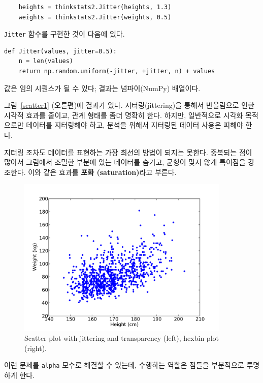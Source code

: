 
%
\begin{verbatim}
    heights = thinkstats2.Jitter(heights, 1.3)
    weights = thinkstats2.Jitter(weights, 0.5)
\end{verbatim}

{\tt Jitter} 함수를 구현한 것이 다음에 있다.

\begin{verbatim}
def Jitter(values, jitter=0.5):
    n = len(values)
    return np.random.uniform(-jitter, +jitter, n) + values
\end{verbatim}

값은 임의 시퀀스가 될 수 있다; 결과는 넘파이(NumPy) 배열이다.

그림~\ref{scatter1} (오른편)에 결과가 있다.
지터링(jittering)을 통해서 반올림으로 인한 시각적 효과를 줄이고,
관계 형태를 좀더 명확히 한다. 하지만, 일반적으로 시각화 목적으로만
데이터를 지터링해야 하고, 분석을 위해서 지터링된 데이터 사용은 피해야 한다.

지터링 조차도 데이터를 표현하는 가장 최선의 방법이 되지는 못한다.
중복되는 점이 많아서 그림에서 조밀한 부분에 있는 데이터를 숨기고,
균형이 맞지 않게 특이점을 강조한다. 이와 같은 효과를 {\bf 포화 (saturation)}라고 부른다.

\begin{figure}
\centerline{\includegraphics[height=3.0in]{figs/scatter2.pdf}}
\caption{Scatter plot with jittering and transparency (left),
hexbin plot (right).}
\label{scatter2}
\end{figure}

이런 문제를 {\tt alpha} 모수로 해결할 수 있는데, 수행하는 역할은 점들을 부분적으로 투명하게 한다.

